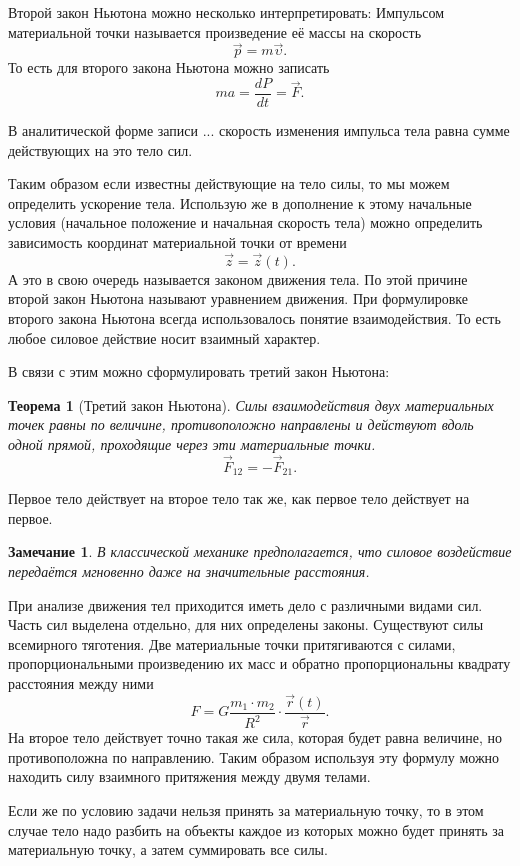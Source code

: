 \documentclass[10pt]{scrbook}
\newtheorem{theorem}{Теорема}[section]
\newtheorem{corollary}{Замечание}[theorem]
\begin{document}
Второй закон Ньютона можно несколько интерпретировать:
Импульсом материальной точки называется произведение её массы на скорость \[
	\vec{p} = m \vec{\upsilon}
	.\] То есть для второго закона Ньютона можно записать \[
	m a = \frac{d P}{d t} = \vec{F}
	.\]

В аналитической форме записи ... скорость изменения импульса тела равна сумме
действующих на это тело сил.

Таким образом если известны действующие на тело силы, то мы можем определить
ускорение тела. Использую же в дополнение к этому начальные условия (начальное
положение и начальная скорость тела) можно определить зависимость координат
материальной точки от времени \[
	\vec{z} = \vec{z}(t)
	.\] А это в свою очередь называется законом движения тела. По этой причине
второй закон Ньютона называют уравнением движения. При формулировке второго
закона Ньютона всегда использовалось понятие взаимодействия. То есть любое
силовое действие носит взаимный характер.

В связи с этим можно сформулировать третий закон Ньютона:
\begin{theorem}[Третий закон Ньютона]\label{thrm:third-nuton}
	Силы взаимодействия двух материальных точек равны по величине, противоположно
	направлены и действуют вдоль одной прямой, проходящие через эти материальные
	точки.\[
		\vec{F}_{12} = - \vec{F}_{21}
		.\]
\end{theorem}

Первое тело действует на второе тело так же, как первое тело действует на
первое.

\begin{corollary}
	В классической механике предполагается, что силовое воздействие передаётся
	мгновенно даже на значительные расстояния.
\end{corollary}

При анализе движения тел приходится иметь дело с различными видами сил. Часть
сил выделена отдельно, для них определены законы. Существуют силы всемирного
тяготения. Две материальные точки притягиваются с силами, пропорциональными
произведению их масс и обратно пропорциональны квадрату расстояния между ними
\[
	F = G \frac{m_1 \cdot m_2}{R^2} \cdot \frac{\vec{r}(t)}{\vec{r}}
	.\] На второе тело действует точно такая же сила, которая будет равна
величине, но противоположна по направлению. Таким образом используя эту
формулу можно находить силу взаимного притяжения между двумя телами.

Если же по условию задачи нельзя принять за материальную точку, то в этом
случае тело надо разбить на объекты каждое из которых можно будет принять за
материальную точку, а затем суммировать все силы.
\end{document}
